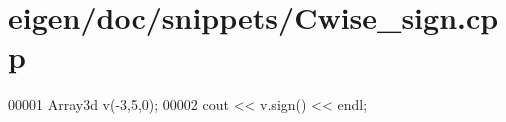 \hypertarget{eigen_2doc_2snippets_2_cwise__sign_8cpp_source}{}\section{eigen/doc/snippets/\+Cwise\+\_\+sign.cpp}
\label{eigen_2doc_2snippets_2_cwise__sign_8cpp_source}

\begin{DoxyCode}
00001 Array3d v(-3,5,0);
00002 cout << v.sign() << endl;
\end{DoxyCode}
